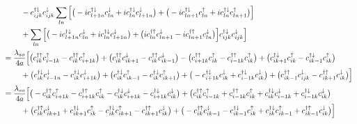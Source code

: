 \documentclass[10pt,prb,showpacs,amssymb,floatfix]{revtex4-1}
\newcommand{\dg}{\dagger}
\newcommand{\dna}{\downarrow}
\newcommand{\nn}{\nonumber}
\newcommand{\upa}{\uparrow}
\begin{document}
\begin{align}
& ~~~~~~~ - c_{ijk}^{\dg\dna} c_{ijk}^{\dna}  \sum_{ln}  \Big{[} \big{(} - i c_{l+1n}^{\dagger \downarrow} c_{ln}^\downarrow + i c_{ln}^{\dagger \downarrow} c_{l+1n}^{ \downarrow}   \big{)} +  \big{(} -i c_{l n+1}^{\dagger \downarrow}  c_{l n}^\uparrow  + i  c_{ln}^{\dagger \downarrow} c_{ln+1}^{ \uparrow}   \big{)}  \Big{]} \nn\\
& ~~~~~~~  + \sum_{ln}  \Big{[} \big{(}  - i c_{l+1n}^{\dagger \downarrow} c_{ln}^\downarrow  + i c_{ln}^{\dagger \downarrow} c_{l+1n}^{ \downarrow}   \big{)} +  \big{(} i c_{l n}^{\dagger \uparrow} c_{l n+1}^{ \downarrow}    - i c_{ln+1}^{\dagger \uparrow}  c_{ln}^\downarrow  \big{)}  \Big{]}  c_{ijk}^{\dg\dna} c_{ijk}^{\dna}  \Big{]} \nn\\
&= \frac{\lambda_{so}}{4a} \Big{[}     \big{(} c_{ik}^{\dg\upa}  c_{i-1 k}^\uparrow -  c_{ik}^{\dg\upa}  c_{i+1k}^{\uparrow}    \big{)} +  \big{(}  c_{ik}^{\dg\upa}  c_{i k+1}^{ \downarrow}    -  c_{ik}^{\dg\upa}   c_{ik-1}^\downarrow \big{)}   - \big{(} c_{i+1k}^{\dagger \uparrow} c_{ik}^{\upa}  -  c_{i-1 k}^{\dagger \uparrow} c_{ik}^{\upa}  \big{)} +  \big{(}  c_{i k+1}^{\dagger \downarrow} c_{ik}^{\upa}   -  c_{ik-1}^{\dagger \downarrow} c_{ik}^{\upa}   \big{)}    \nn\\
& ~~~~~~~ +   \big{(}    c_{ik}^{\dg\dna} c_{i-1n}^\downarrow -   c_{ik}^{\dg\dna} c_{i+1k}^{ \downarrow}   \big{)} +  \big{(}   c_{ik}^{\dg\dna} c_{i k-1}^\uparrow  -   c_{ik}^{\dg\dna} c_{ik+1}^{ \uparrow}   \big{)}   +  \big{(}  -  c_{i+1k}^{\dagger \downarrow}c_{ik}^{\dna}    +  c_{i-1k}^{\dagger \downarrow} c_{ik}^{\dna}    \big{)} +  \big{(}  c_{i k-1}^{\dagger \uparrow} c_{ijk}^{\dna}     -  c_{ik+1}^{\dagger \uparrow} c_{ik}^{\dna}     \big{)}    \Big{]} \nn\\
&= \frac{\lambda_{so}}{4a} \Big{[}     \big{(} -  c_{ik}^{\dg\upa}  c_{i+1k}^{\uparrow}   -c_{i+1k}^{\dagger \uparrow} c_{ik}^{\upa}   -   c_{ik}^{\dg\dna} c_{i+1k}^{ \downarrow}   -  c_{i+1k}^{\dagger \downarrow}c_{ik}^{\dna}    \big{)}    + \big{(} c_{ik}^{\dg\upa}  c_{i-1 k}^\uparrow   +  c_{i-1 k}^{\dagger \uparrow} c_{ik}^{\upa}  + c_{ik}^{\dg\dna} c_{i-1k}^\downarrow +  c_{i-1k}^{\dagger \downarrow} c_{ik}^{\dna}  \big{)}    \nn\\
& ~~~~~~~ + \big{(}  c_{ik}^{\dg\upa}  c_{i k+1}^{ \downarrow} +  c_{i k+1}^{\dagger \downarrow} c_{ik}^{\upa}   -   c_{ik}^{\dg\dna} c_{ik+1}^{ \uparrow}   -  c_{ik+1}^{\dagger \uparrow} c_{ik}^{\dna}    \big{)}  +  \big{(}  -  c_{ik}^{\dg\upa}   c_{ik-1}^\downarrow   -  c_{ik-1}^{\dagger \downarrow} c_{ik}^{\upa} +  c_{ik}^{\dg\dna} c_{i k-1}^\uparrow  + c_{i k-1}^{\dagger \uparrow} c_{ik}^{\dna}  \big{)}        \Big{]}
\end{align}
\end{document}
